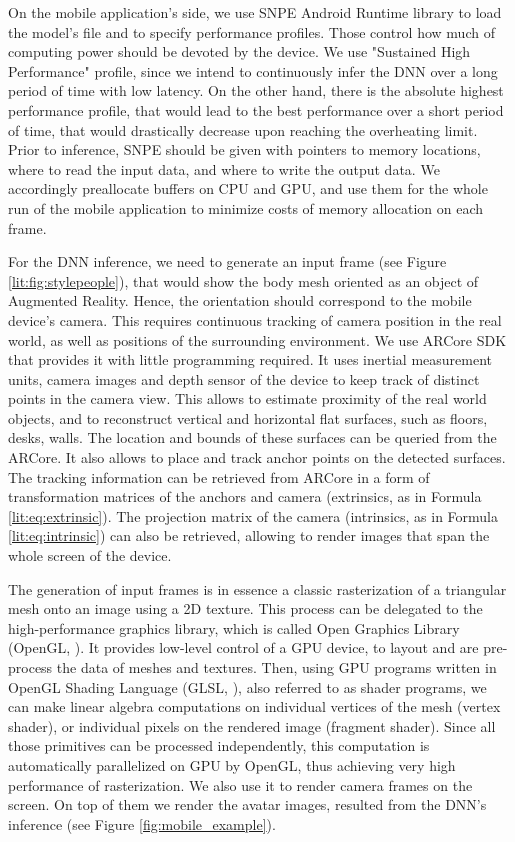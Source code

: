 On the mobile application's side, we use SNPE Android Runtime library to load the model's file and to specify performance profiles. Those control how much of computing power should be devoted by the device. We use "Sustained High Performance" profile, since we intend to continuously infer the DNN over a long period of time with low latency. On the other hand, there is the absolute highest performance profile, that would lead to the best performance over a short period of time, that would drastically decrease upon reaching the overheating limit. Prior to inference, SNPE should be given with pointers to memory locations, where to read the input data, and where to write the output data. We accordingly preallocate buffers on CPU and GPU, and use them for the whole run of the mobile application to minimize costs of memory allocation on each frame.

For the DNN inference, we need to generate an input frame (see Figure \ref{lit:fig:stylepeople}), that would show the body mesh oriented as an object of Augmented Reality. Hence, the orientation should correspond to the mobile device's camera. This requires continuous tracking of camera position in the real world, as well as positions of the surrounding environment. We use ARCore SDK \cite{aux:arcore22} that provides it with little programming required. It uses inertial measurement units, camera images and depth sensor of the device to keep track of distinct points in the camera view. This allows to estimate proximity of the real world objects, and to reconstruct vertical and horizontal flat surfaces, such as floors, desks, walls. The location and bounds of these surfaces can be queried from the ARCore. It also allows to place and track anchor points on the detected surfaces. The tracking information can be retrieved from ARCore in a form of transformation matrices of the anchors and camera (extrinsics, as in Formula \ref{lit:eq:extrinsic}). The projection matrix of the camera (intrinsics, as in Formula \ref{lit:eq:intrinsic}) can also be retrieved, allowing to render images that span the whole screen of the device. 

The generation of input frames is in essence a classic rasterization of a triangular mesh onto an image using a 2D texture. This process can be delegated to the high-performance graphics library, which is called Open Graphics Library (OpenGL, \cite{aux:opengl22}). It provides low-level control of a GPU device, to layout and are pre-process the data of meshes and textures. Then, using GPU programs written in OpenGL Shading Language (GLSL, \cite{aux:glsl21}), also referred to as shader programs, we can make linear algebra computations on individual vertices of the mesh (vertex shader), or individual pixels on the rendered image (fragment shader). Since all those primitives can be processed independently, this computation is automatically parallelized on GPU by OpenGL, thus achieving very high performance of rasterization. We also use it to render camera frames on the screen. On top of them we render the avatar images, resulted from the DNN's inference (see Figure \ref{fig:mobile_example}).

